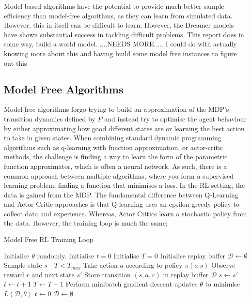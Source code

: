 Model-based algorithms have the potential to provide much better sample efficiency than model-free algorithms, as they can learn from simulated data. However, this in itself can be difficult to learn. However, the Dreamer models have shown substantial success in tackling difficult problems\cite{hafner2023mastering, hafner2020mastering}. This report does in some way, build a world model.
....NEEDS MORE..... I could do with actually knowing more about this and having build some model free instances to figure out this
\subsection{Model Free Algorithms}
Model-free algorithms forgo trying to build an approximation of the MDP's transition dynamics defined by $P$ and instead try to optimise the agent behaviour by either approximating how good different states are or learning the best action to take in given states. When combining standard dynamic programming algorithms such as q-learning with function approximation, or actor-critic methods, the challenge is finding a way to learn the form of the parametric function approximator, which is often a neural network. As such, there is a common approach between multiple algorithms, where you form a supervised learning problem, finding a function that minimises a loss. In the RL setting, the data is gained from the MDP. The fundamental difference between Q-Learning and Actor-Critic approaches is that Q-learning uses an epsilon greedy policy to collect data and experience. Whereas, Actor Critics learn a stochastic policy from the data. However, the training loop is much the same;
\begin{algorithm}
	\caption{Model Free RL Training Loop}
	\begin{algorithmic}
		\State Initialise $\theta$ randomly.
		\State Initialise $t=0$
		\State Initialise $T=0$
		\State Initialise replay buffer $\mathcal{D} \leftarrow \emptyset$
		\State Sample state $s$
		\While $\text{ }T < T_{max}$
		\State Take action $a$ according to policy $\pi(a|s)$
		\State Observe reward $r$ and next state $s'$
		\State Store transition $(s, a, r)$ in replay buffer $\mathcal{D}$
		\State $s \leftarrow s'$
		\State $t \leftarrow t+1$
		\State $T \leftarrow T+1$
		\State Perform minibatch gradient descent updates $\theta$ to minimise $L(\mathcal{D},\theta)$
		\State $t \leftarrow 0$
		\State $\mathcal{D} \leftarrow \emptyset$
		\EndIf

		\EndWhile

	\end{algorithmic}
\end{algorithm}

